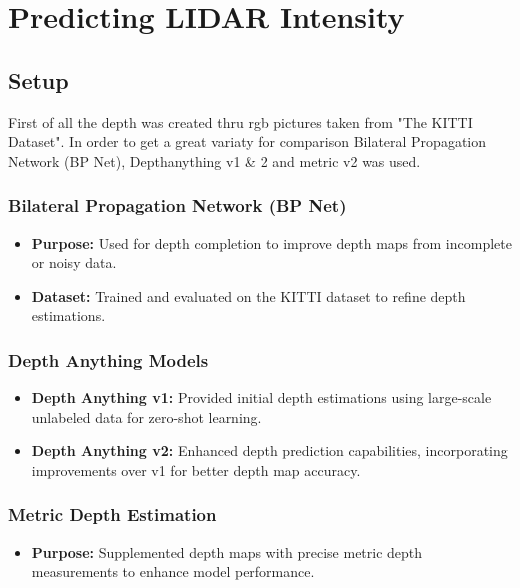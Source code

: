 \chapter{Predicting LIDAR Intensity} %
\section{Setup}
First of all the depth was created thru rgb pictures taken from "The KITTI Dataset". In order to get a great variaty for comparison Bilateral Propagation Network (BP Net), Depthanything v1 \& 2 and metric v2 was used. 
\subsection{Bilateral Propagation Network (BP Net)}
\begin{itemize}
	\item \textbf{Purpose:} Used for depth completion to improve depth maps from incomplete or noisy data.
	\item \textbf{Dataset:} Trained and evaluated on the KITTI dataset to refine depth estimations.
\end{itemize}

\subsection{Depth Anything Models}
\begin{itemize}
	\item \textbf{Depth Anything v1:} Provided initial depth estimations using large-scale unlabeled data for zero-shot learning.
	\item \textbf{Depth Anything v2:} Enhanced depth prediction capabilities, incorporating improvements over v1 for better depth map accuracy.
\end{itemize}

\subsection{Metric Depth Estimation}
\begin{itemize}
	\item \textbf{Purpose:} Supplemented depth maps with precise metric depth measurements to enhance model performance.
\end{itemize}

